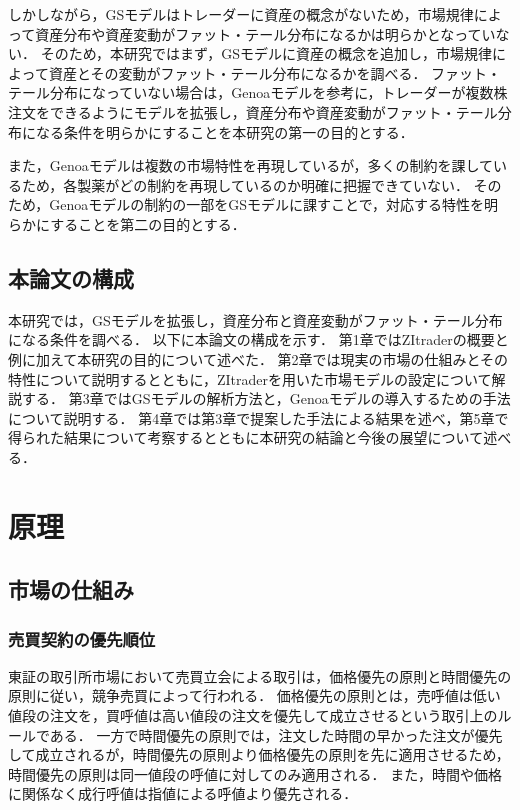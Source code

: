 \documentclass[titlepage]{jsreport}
\begin{document}
しかしながら，GSモデルはトレーダーに資産の概念がないため，市場規律によって資産分布や資産変動がファット・テール分布になるかは明らかとなっていない．
そのため，本研究ではまず，GSモデルに資産の概念を追加し，市場規律によって資産とその変動がファット・テール分布になるかを調べる．
ファット・テール分布になっていない場合は，Genoaモデルを参考に，トレーダーが複数株注文をできるようにモデルを拡張し，資産分布や資産変動がファット・テール分布になる条件を明らかにすることを本研究の第一の目的とする．

また，Genoaモデルは複数の市場特性を再現しているが，多くの制約を課しているため，各製薬がどの制約を再現しているのか明確に把握できていない．
そのため，Genoaモデルの制約の一部をGSモデルに課すことで，対応する特性を明らかにすることを第二の目的とする．


\section{本論文の構成}
本研究では，GSモデルを拡張し，資産分布と資産変動がファット・テール分布になる条件を調べる．
以下に本論文の構成を示す．
第1章ではZItraderの概要と例に加えて本研究の目的について述べた．
第2章では現実の市場の仕組みとその特性について説明するとともに，ZItraderを用いた市場モデルの設定について解説する．
第3章ではGSモデルの解析方法と，Genoaモデルの導入するための手法について説明する．
第4章では第3章で提案した手法による結果を述べ，第5章で得られた結果について考察するとともに本研究の結論と今後の展望について述べる．

\chapter{原理} \label{chap:principle}

\section{市場の仕組み}
\subsection{売買契約の優先順位}
東証の取引所市場において売買立会による取引は，価格優先の原則と時間優先の原則に従い，競争売買によって行われる\cite{shokengaimuin}．
価格優先の原則とは，売呼値は低い値段の注文を，買呼値は高い値段の注文を優先して成立させるという取引上のルールである．
一方で時間優先の原則では，注文した時間の早かった注文が優先して成立されるが，時間優先の原則より価格優先の原則を先に適用させるため，時間優先の原則は同一値段の呼値に対してのみ適用される．
また，時間や価格に関係なく成行呼値は指値による呼値より優先される．
\end{document}
